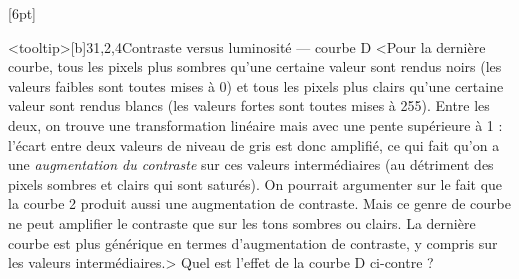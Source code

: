\begin{quiz}[title={Photographie numérique}]
\vspace{-.5\baselineskip}
[6pt]%
\begin{quizquestion*}<tooltip>[b]{3}{1,2,4}{Contraste {\upshape versus} luminosité --- courbe D}
<Pour la dernière courbe, tous les pixels plus sombres qu'une certaine valeur sont rendus noirs (les valeurs faibles sont toutes mises à 0) et tous les pixels plus clairs qu'une certaine valeur sont rendus blancs (les valeurs fortes sont toutes mises à 255). Entre les deux, on trouve une transformation linéaire mais avec une pente supérieure à 1 : l'écart entre deux valeurs de niveau de gris est donc amplifié, ce qui fait qu'on a une \emph{augmentation du contraste} sur ces valeurs intermédiaires (au détriment des pixels sombres et clairs qui sont saturés). On pourrait argumenter sur le fait que la courbe 2 produit aussi une augmentation de contraste. Mais ce genre de courbe ne peut amplifier le contraste que sur les tons sombres ou clairs. La dernière courbe est plus générique en termes d'augmentation de contraste, y compris sur les valeurs intermédiaires.>
Quel est l'effet de la courbe D ci-contre ?
\end{quizquestion*}
\vspace{-.5\baselineskip}
\end{quiz}

